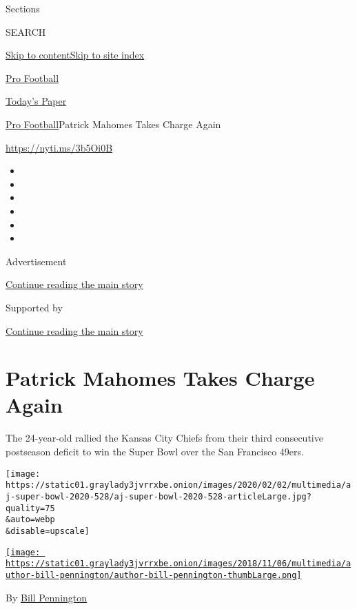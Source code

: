 Sections

SEARCH

\protect\hyperlink{site-content}{Skip to
content}\protect\hyperlink{site-index}{Skip to site index}

\href{https://www.nytimes3xbfgragh.onion/section/sports/football}{Pro
Football}

\href{https://myaccount.nytimes3xbfgragh.onion/auth/login?response_type=cookie\&client_id=vi}{}

\href{https://www.nytimes3xbfgragh.onion/section/todayspaper}{Today's
Paper}

\href{/section/sports/football}{Pro Football}\textbar{}Patrick Mahomes
Takes Charge Again

\url{https://nyti.ms/3b5Oi0B}

\begin{itemize}
\item
\item
\item
\item
\item
\item
\end{itemize}

Advertisement

\protect\hyperlink{after-top}{Continue reading the main story}

Supported by

\protect\hyperlink{after-sponsor}{Continue reading the main story}

\hypertarget{patrick-mahomes-takes-charge-again}{%
\section{Patrick Mahomes Takes Charge
Again}\label{patrick-mahomes-takes-charge-again}}

The 24-year-old rallied the Kansas City Chiefs from their third
consecutive postseason deficit to win the Super Bowl over the San
Francisco 49ers.

\texttt{[image: https://static01.graylady3jvrrxbe.onion/images/2020/02/02/multimedia/aj-super-bowl-2020-528/aj-super-bowl-2020-528-articleLarge.jpg?quality=75\\\&auto=webp\\\&disable=upscale]}

\href{https://www.nytimes3xbfgragh.onion/by/bill-pennington}{\texttt{[image: https://static01.graylady3jvrrxbe.onion/images/2018/11/06/multimedia/author-bill-pennington/author-bill-pennington-thumbLarge.png]}}

By \href{https://www.nytimes3xbfgragh.onion/by/bill-pennington}{Bill
Pennington}

